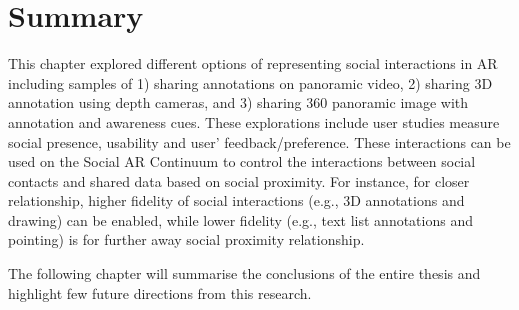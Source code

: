\section{Summary}

This chapter explored different options of representing social interactions in AR including samples of 1) sharing annotations on panoramic video, 2) sharing 3D annotation using depth cameras, and 3) sharing 360 panoramic image with annotation and awareness cues. These explorations include user studies measure social presence, usability and user' feedback/preference. These interactions can be used on the Social AR Continuum to control the interactions between social contacts and shared data based on social proximity. For instance, for closer relationship, higher fidelity of social interactions (e.g., 3D annotations and drawing) can be enabled, while lower fidelity (e.g., text list annotations and pointing) is for further away social proximity relationship.

The following chapter will summarise the conclusions of the entire thesis and highlight few future directions from this research.
